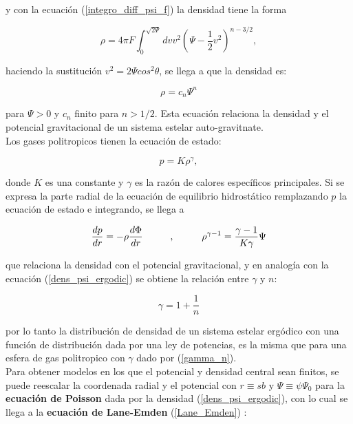 y con la ecuación (\ref{integro_diff_psi_f}) la densidad tiene la forma \cite{BT08}

\begin{equation}
\rho = 4\pi F \int_0^{\sqrt{2\Psi}} dv v^2 \left( \Psi - \frac{1}{2}v^2 \right)^{n-3/2},
\end{equation}

haciendo la sustitución $v^2 = 2\Psi cos^2\theta$, se llega a que la densidad es:

\begin{equation}
\label{dens_psi_ergodic}
\rho = c_n \Psi^n
\end{equation}

para $\Psi > 0$ y $c_n$  finito para $n> 1/2$. Esta ecuación relaciona la densidad y el potencial gravitacional de un sistema estelar auto-gravitnate.\\

Los gases politropicos tienen la ecuación de estado:

$$ p = K\rho^{\gamma}, $$

donde $K$ es una constante y $\gamma$ es la razón de calores específicos principales. Si se expresa la parte radial de la ecuación de equilibrio hidrostático remplazando $p$ la ecuación de estado \cite{BT08} e integrando, se llega a

$$ \frac{d p}{dr} = -\rho \frac{d\Phi}{dr}   \hspace{1 cm},\hspace{1 cm}  \rho^{\gamma - 1} = \frac{\gamma - 1}{K \gamma} \Psi  $$

que relaciona la densidad con el potencial gravitacional, y en analogía con la ecuación (\ref{dens_psi_ergodic}) se obtiene la relación entre $\gamma$ y $n$:

\begin{equation}
\label{gamma_n}
 \gamma = 1+\frac{1}{n}
\end{equation}

por lo tanto la distribución de densidad de un sistema estelar ergódico con una función de distribución dada por una ley de potencias, es la misma que para una esfera de gas politropico con $\gamma$ dado por (\ref{gamma_n}).\\

Para obtener modelos en los que el potencial y densidad central sean finitos, se puede reescalar la coordenada radial y el potencial con $r \equiv sb $ y $\Psi  \equiv \psi \Psi_0 $ para la \textbf{ecuación de Poisson} dada por la densidad (\ref{dens_psi_ergodic}), con lo cual se llega a la \textbf{ecuación de Lane-Emden} (\ref{Lane_Emden}) \cite{BT08}:

